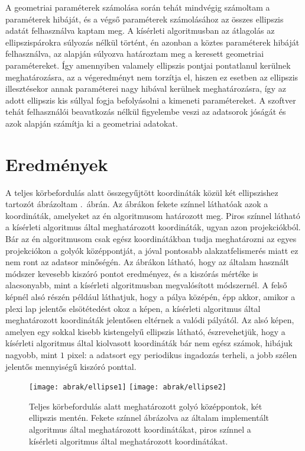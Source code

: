 \documentclass[a4paper,12pt]{article}
\begin{document}
A geometriai paraméterek számolása során tehát mindvégig számoltam a paraméterek hibáját, és a végső paraméterek számolásához az összes ellipszis adatát felhasználva kaptam meg. A kísérleti algoritmusban az átlagolás az ellipszispárokra súlyozás nélkül történt, én azonban a köztes paraméterek hibáját felhasználva, az alapján súlyozva határoztam meg a keresett geometriai paramétereket. Így amennyiben valamely ellipszis pontjai pontatlanul kerülnek meghatározásra, az a végeredményt nem torzítja el, hiszen ez esetben az ellipszis illesztésekor annak paraméterei nagy hibával kerülnek meghatározásra, így az adott ellipszis kis súllyal fogja befolyásolni a kimeneti paramétereket. A szoftver tehát felhasználói beavatkozás nélkül figyelembe veszi az adatsorok jóságát és azok alapján számítja ki a geometriai adatokat.


\section{Eredmények}



A teljes körbefordulás alatt összegyűjtött koordináták közül két ellipszishez tartozót ábrázoltam .~ábrán. Az ábrákon fekete színnel láthatóak azok a koordináták, amelyeket az én algoritmusom határozott meg. Piros színnel látható a kísérleti algoritmus által meghatározott koordináták, ugyan azon projekciókból. Bár az én algoritmusom csak egész koordinátákban tudja meghatározni az egyes projekciókon a golyók középpontját, a jóval pontosabb alakzatfelismerés miatt ez nem ront az adatsor minőségén. Az ábrákon látható, hogy az általam használt módszer kevesebb kiszóró pontot eredményez, és a kiszórás mértéke is alacsonyabb, mint a kísérleti algoritmusban megvalósított módszernél. A felső képnél alsó részén például láthatjuk, hogy a pálya középén, épp akkor, amikor a plexi lap jelentős elsötétedést okoz a képen, a kísérleti algoritmus által meghatározott koordináták jelentősen eltérnek a valódi pályától. Az alsó képen, amelyen egy sokkal kisebb kistengelyű ellipszis látható, észrevehetjük, hogy a kísérleti algoritmus által kiolvasott koordináták bár nem egész számok, hibájuk nagyobb, mint $1$ pixel: a adatsort egy periodikus ingadozás terheli, a jobb szélen jelentős mennyiségű kiszóró ponttal. 


\begin{figure}[htbp]
\center
\texttt{[image: abrak/ellipse1]}
\texttt{[image: abrak/ellipse2]}
\caption{Teljes körbefordulás alatt meghatározott golyó középpontok, két ellipszis mentén. Fekete színnel ábrázolva az általam implementált algoritmus által meghatározott koordinátákat, piros színnel a kísérleti algoritmus által meghatározott koordinátákat.}
\label{fig:ellipses}
\end{figure}
\end{document}
